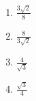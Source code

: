 \documentclass[journal,12pt,onecolumn]{IEEEtran}
\theoremstyle{remark}
\begin{document}
\begin{enumerate}
\begin{multicols}{4}
\begin{enumerate}
                
    \item $\frac{3\sqrt{2}}{8}$
        \item $\frac{8}{3\sqrt{2}}$
        \item $\frac{4}{\sqrt{3}}$
        \item $\frac{\sqrt{3}}{4}$
        
            \end{enumerate}
            \end{multicols}
            
    
        
        
    
    \end{enumerate}
\end{document}
